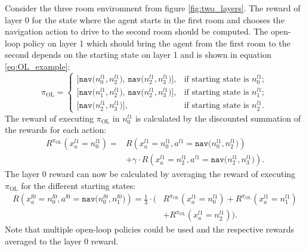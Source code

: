 \begin{example}\label{ex:R_OL}
Consider the three room environment from figure \ref{fig:two_layers}. The reward of layer 0 for the state where the agent starts in the first room and chooses the navigation action to drive to the second room should be computed. The open-loop policy on layer 1 which should bring the agent from the first room to the second depends on the starting state on layer 1 and is shown in equation \ref{eq:OL_example}:
\begin{equation}\label{eq:OL_example}
    \pi_\text{OL} = \begin{cases}
    \texttt{[nav($n_0^{l1}, n_2^{l1}$), nav($n_2^{l1}, n_3^{l1}$)]}, & \text{if starting state is }n_0^{l1};\\
    \texttt{[nav($n_1^{l1}, n_2^{l1}$), nav($n_2^{l1}, n_3^{l1}$)]}, & \text{if starting state is }n_1^{l1};\\
    \texttt{[nav($n_2^{l1}, n_3^{l1}$)]}, & \text{if starting state is }n_2^{l1}.
    \end{cases}
\end{equation}
The reward of executing $\pi_\text{OL}$ in $n_0^{l1}$ is calculated by the discounted summation of the rewards for each action:
\begin{equation}
    \begin{aligned}
    R^{\pi_\text{OL}}\left(x_a^{l1}=n_0^{l1}\right)=
    &R\left(x_a^{l1}=n_0^{l1}, a^{l1}=\texttt{nav($n_0^{l1}, n_2^{l1}$)} \right) \\
    &+ \gamma \cdot R\left(x_a^{l1}=n_2^{l1}, a^{l1}=\texttt{nav($n_2^{l1}, n_3^{l1}$)} \right).
\end{aligned}
\end{equation}
The layer 0 reward can now be calculated by averaging the reward of executing $\pi_\text{OL}$ for the different starting states:
\begin{equation}
    \begin{aligned}
       R\left(x_a^{l0}=n_0^{l0}, a^{l0}=\texttt{nav($n_0^{l0}, n_1^{l0}$)}\right) = \frac{1}{3}\cdot \big(&R^{\pi_\text{OL}}\left(x_a^{l1}=n_0^{l1}\right) + R^{\pi_\text{OL}}\left(x_a^{l1}=n_1^{l1}\right)\\
       &+ R^{\pi_\text{OL}}\left(x_a^{l1}=n_2^{l1}\right)\big).
    \end{aligned}
\end{equation}
Note that multiple open-loop policies could be used and the respective rewards averaged to the layer 0 reward. 
\demo
\end{example}


